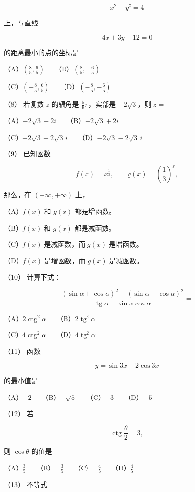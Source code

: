 \begin{answer}
\nopagebreak[4]
\[
x^2+y^2=4
\]

上，与直线

\nopagebreak[4]
\[
4x+3y-12=0
\]

的距离最小的点的坐标是

（A）$\left(\frac85,\frac65\right)$　　（B）$\left(\frac85,-\frac65\right)$

（C）$\left(-\frac85,\frac65\right)$　　（D）$\left(-\frac85,-\frac65\right)$

（8） 若复数 $z$ 的辐角是 $\frac56\pi$，实部是 $-2\sqrt3$，则 $z=$

（A）$-2\sqrt3-2i$　　（B）$-2\sqrt3+2i$

（C）$-2\sqrt3+2\sqrt3\,i$　　（D）$-2\sqrt3-2\sqrt3\,i$

（9） 已知函数

\nopagebreak[4]
\[
f(x)=x^{\frac13},\qquad g(x)=\left(\frac13\right)^x,
\]

那么，在 $(-\infty,+\infty)$ 上，

（A）$f(x)$ 和 $g(x)$ 都是增函数。

（B）$f(x)$ 和 $g(x)$ 都是减函数。

（C）$f(x)$ 是减函数，而 $g(x)$ 是增函数。

（D）$f(x)$ 是增函数，而 $g(x)$ 是减函数。

（10） 计算下式：

\nopagebreak[4]
\[
\frac{(\sin\alpha+\cos\alpha)^2-(\sin\alpha-\cos\alpha)^2}
{\operatorname{tg}\alpha-\sin\alpha\cos\alpha}
=
\]

（A）$2\operatorname{ctg}^2\alpha$　　（B）$2\operatorname{tg}^2\alpha$

（C）$4\operatorname{ctg}^2\alpha$　　（D）$4\operatorname{tg}^2\alpha$

（11） 函数

\nopagebreak[4]
\[
y=\sin3x+2\cos3x
\]

的最小值是

（A）$-2$　　（B）$-\sqrt5$　　（C）$-3$　　（D）$-5$

（12） 若

\nopagebreak[4]
\[
\operatorname{ctg}\frac\theta2=3,
\]

则 $\cos\theta$ 的值是

（A）$\frac35$　　（B）$-\frac35$　　（C）$-\frac45$　　（D）$\frac45$

（13） 不等式


\end{answer}
